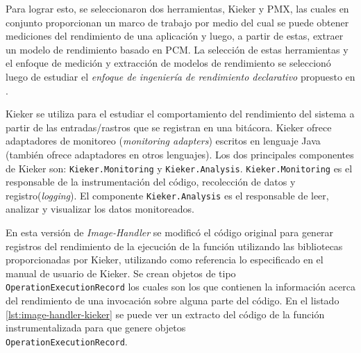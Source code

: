 Para lograr esto, se seleccionaron dos herramientas, Kieker y PMX, las cuales en conjunto proporcionan un marco de trabajo por medio del cual se puede obtener mediciones del rendimiento de una aplicación y luego, a partir de estas, extraer un modelo de rendimiento basado en PCM. La selección de estas herramientas y el enfoque de medición y extracción de modelos de rendimiento se seleccionó luego de estudiar el \emph{enfoque de ingeniería de rendimiento declarativo} propuesto en \cite{Walter:2018:TDP:3185768.3185777}.



Kieker se utiliza para el estudiar el comportamiento del rendimiento del sistema a partir de las entradas/rastros que se registran en una bitácora. Kieker ofrece adaptadores de monitoreo (\emph{monitoring adapters}) escritos en lenguaje Java (también ofrece adaptadores en otros lenguajes). Los dos principales componentes de Kieker son: \texttt{Kieker.Monitoring} y \texttt{Kieker.Analysis}. \texttt{Kieker.Monitoring} es el responsable de la instrumentación del código, recolección de datos y registro(\emph{logging}). El componente \texttt{Kieker.Analysis} es el responsable de leer, analizar y visualizar los datos monitoreados.

En esta versión de \emph{Image-Handler} se modificó el código original para generar registros del rendimiento de la ejecución de la función utilizando las bibliotecas proporcionadas por Kieker, utilizando como referencia lo especificado en el manual de usuario de Kieker\cite{kieker-user-guide}. Se crean objetos de tipo \texttt{OperationExecutionRecord} los cuales son los que contienen la información acerca del rendimiento de una invocación sobre alguna parte del código.  En el listado \ref{lst:image-handler-kieker} se puede ver un extracto del código de la función instrumentalizada para que genere objetos\\ \texttt{OperationExecutionRecord}.

